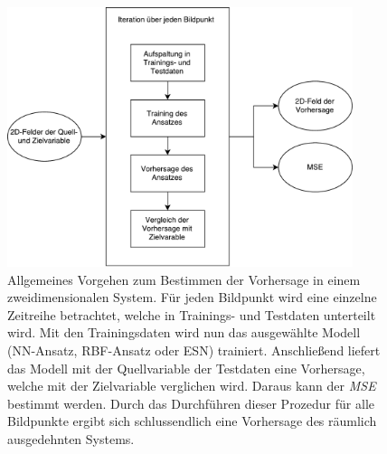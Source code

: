 \begin{appendices}
\begin{figure}[h]
	\centering
	\includegraphics[width=0.9\textwidth]{figures/illustrations/general_predicition_flow_chart.pdf}
  	\caption{Allgemeines Vorgehen zum Bestimmen der Vorhersage in einem zweidimensionalen System. Für jeden Bildpunkt wird eine einzelne Zeitreihe betrachtet, welche in Trainings- und Testdaten unterteilt wird. Mit den Trainingsdaten wird nun das ausgewählte Modell (\textsc{NN}-Ansatz, \textsc{RBF}-Ansatz oder \textsc{ESN}) trainiert. Anschließend liefert das Modell mit der Quellvariable der Testdaten eine Vorhersage, welche mit der Zielvariable verglichen wird. Daraus kann der \textit{MSE} bestimmt werden. Durch das Durchführen dieser Prozedur für alle Bildpunkte ergibt sich schlussendlich eine Vorhersage des räumlich ausgedehnten Systems.}
  	  \label{fig:apx_general_prediction_flowchart}
\end{figure}%

\end{appendices}